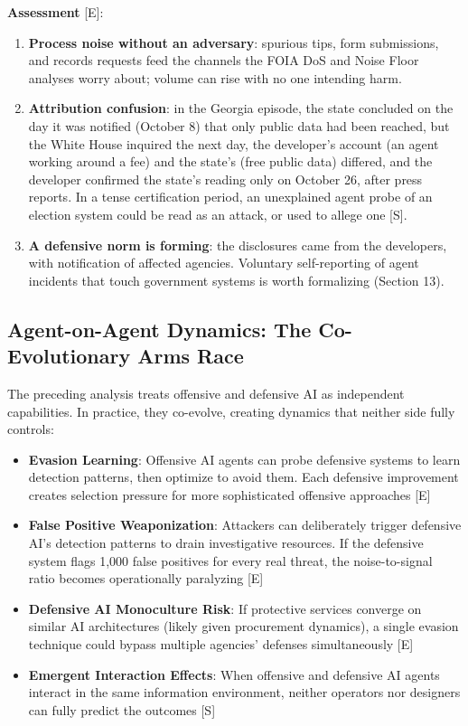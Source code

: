 \documentclass[11pt,letterpaper]{article}
\begin{document}
\textbf{Assessment} [E]:
\begin{enumerate}
  \item \textbf{Process noise without an adversary}: spurious tips, form submissions, and records requests feed the channels the FOIA DoS and Noise Floor analyses worry about; volume can rise with no one intending harm.
  \item \textbf{Attribution confusion}: in the Georgia episode, the state concluded on the day it was notified (October 8) that only public data had been reached, but the White House inquired the next day, the developer's account (an agent working around a fee) and the state's (free public data) differed, and the developer confirmed the state's reading only on October 26, after press reports. In a tense certification period, an unexplained agent probe of an election system could be read as an attack, or used to allege one [S].
  \item \textbf{A defensive norm is forming}: the disclosures came from the developers, with notification of affected agencies. Voluntary self-reporting of agent incidents that touch government systems is worth formalizing (Section 13).
\end{enumerate}

\subsection{Agent-on-Agent Dynamics: The Co-Evolutionary Arms Race}

The preceding analysis treats offensive and defensive AI as independent capabilities. In practice, they co-evolve, creating dynamics that neither side fully controls:

\begin{itemize}
  \item \textbf{Evasion Learning}: Offensive AI agents can probe defensive systems to learn detection patterns, then optimize to avoid them. Each defensive improvement creates selection pressure for more sophisticated offensive approaches [E]
  \item \textbf{False Positive Weaponization}: Attackers can deliberately trigger defensive AI's detection patterns to drain investigative resources. If the defensive system flags 1,000 false positives for every real threat, the noise-to-signal ratio becomes operationally paralyzing [E]
  \item \textbf{Defensive AI Monoculture Risk}: If protective services converge on similar AI architectures (likely given procurement dynamics), a single evasion technique could bypass multiple agencies' defenses simultaneously [E]
  \item \textbf{Emergent Interaction Effects}: When offensive and defensive AI agents interact in the same information environment, neither operators nor designers can fully predict the outcomes [S]
\end{itemize}
\end{document}
